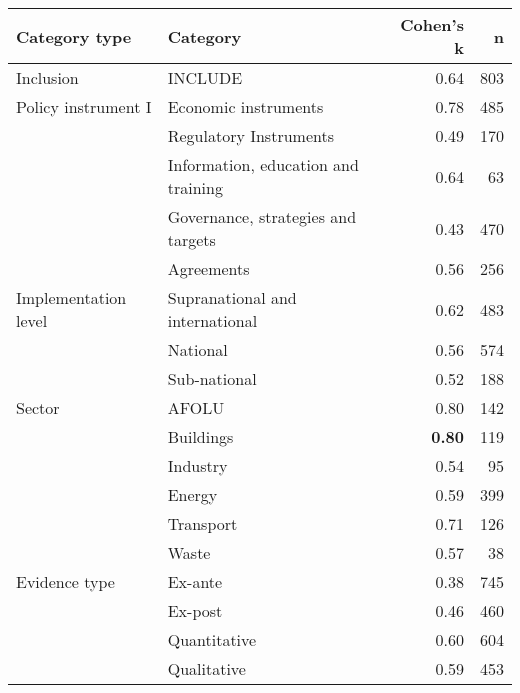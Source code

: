 \begin{tabular}{llrr}
\toprule
Category type & Category & Cohen's k & n \\
\midrule
Inclusion & INCLUDE & 0.64 & 803 \\
Policy instrument I &  Economic instruments & 0.78 & 485 \\
 &  Regulatory Instruments & 0.49 & 170 \\
 &  Information, education and training & 0.64 & 63 \\
 &  Governance, strategies and targets & 0.43 & 470 \\
 &  Agreements & 0.56 & 256 \\
Implementation level &  Supranational and international & 0.62 & 483 \\
 &  National & 0.56 & 574 \\
 &  Sub-national & 0.52 & 188 \\
Sector &  AFOLU & 0.80 & 142 \\
 &  Buildings & \bfseries 0.80 & 119 \\
 &  Industry & 0.54 & 95 \\
 &  Energy & 0.59 & 399 \\
 &  Transport & 0.71 & 126 \\
 &  Waste & 0.57 & 38 \\
Evidence type &  Ex-ante & 0.38 & 745 \\
 &  Ex-post & 0.46 & 460 \\
 &  Quantitative & 0.60 & 604 \\
 &  Qualitative & 0.59 & 453 \\
\bottomrule
\end{tabular}
